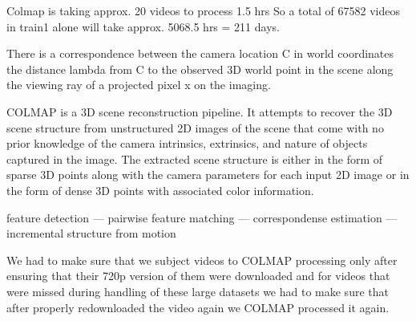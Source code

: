  





Colmap is taking approx. 20 videos to process 1.5 hrs 
So a total of 67582 videos in train1 alone will take approx. 5068.5 hrs = 211 days.


There is a correspondence between the camera location C in world coordinates the distance lambda from C to the observed 3D world point in the scene along the viewing ray of a projected pixel x on the imaging. 

COLMAP is a 3D scene reconstruction pipeline. It attempts to recover the 3D scene structure from unstructured 2D images of the scene that come with no prior knowledge of the camera intrinsics, extrinsics, and nature of objects captured in the image. The extracted scene structure is either in the form of sparse 3D points along with the camera parameters for each input 2D image or in the form of dense 3D points with associated color information.

feature detection --- pairwise feature matching --- correspondense estimation --- incremental structure from motion

We had to make sure that we subject videos to COLMAP processing only after ensuring that their 720p version of them were downloaded and for videos that were missed during handling of these large datasets we had to make sure that after properly redownloaded the video again we COLMAP processed it again. 






